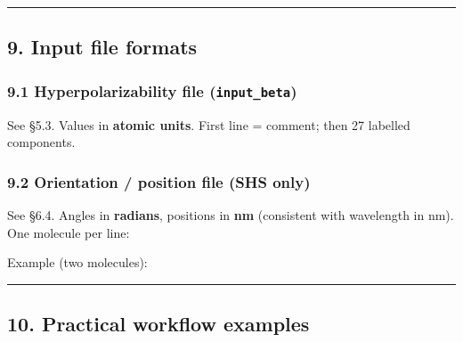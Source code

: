 \begin{center}\rule{0.5\linewidth}{0.5pt}\end{center}

\hypertarget{input-file-formats}{%
\subsection{9. Input file formats}\label{input-file-formats}}

\hypertarget{hyperpolarizability-file-input_beta}{%
\subsubsection{\texorpdfstring{9.1 Hyperpolarizability file
(\texttt{input\_beta})}{9.1 Hyperpolarizability file (input\_beta)}}\label{hyperpolarizability-file-input_beta}}

See §5.3. Values in \textbf{atomic units}. First line = comment; then 27
labelled components.

\hypertarget{orientation-position-file-shs-only}{%
\subsubsection{9.2 Orientation / position file (SHS
only)}\label{orientation-position-file-shs-only}}

See §6.4. Angles in \textbf{radians}, positions in \textbf{nm}
(consistent with wavelength in nm). One molecule per line:

\begin{Shaded}
\begin{Highlighting}[]
\end{Highlighting}
\end{Shaded}

Example (two molecules):

\begin{Shaded}
\begin{Highlighting}[]
\end{Highlighting}
\end{Shaded}

\begin{center}\rule{0.5\linewidth}{0.5pt}\end{center}

\hypertarget{practical-workflow-examples}{%
\subsection{10. Practical workflow
examples}\label{practical-workflow-examples}}

